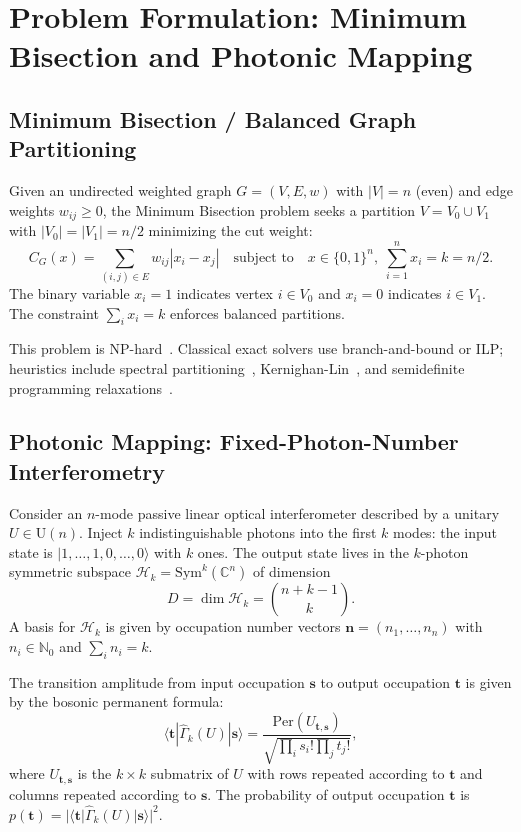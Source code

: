 \section{Problem Formulation: Minimum Bisection and Photonic Mapping}
\label{sec:problem}

\subsection{Minimum Bisection / Balanced Graph Partitioning}

Given an undirected weighted graph $G=(V,E,w)$ with $|V|=n$ (even) and edge weights $w_{ij}\ge 0$, the Minimum Bisection problem seeks a partition $V = V_0 \cup V_1$ with $|V_0|=|V_1|=n/2$ minimizing the cut weight:
\begin{equation}
\label{eq:min_bisection}
C_G(x) = \sum_{(i,j)\in E} w_{ij} |x_i - x_j| \quad \text{subject to} \quad x \in \{0,1\}^n,\; \sum_{i=1}^n x_i = k = n/2.
\end{equation}
The binary variable $x_i=1$ indicates vertex $i \in V_0$ and $x_i=0$ indicates $i \in V_1$. The constraint $\sum_i x_i = k$ enforces balanced partitions.

This problem is NP-hard~\cite{garey1976complexity}. Classical exact solvers use branch-and-bound or ILP; heuristics include spectral partitioning~\cite{fiedler1973algebraic}, Kernighan-Lin~\cite{kernighan1970efficient}, and semidefinite programming relaxations~\cite{goemans1995improved}.

\subsection{Photonic Mapping: Fixed-Photon-Number Interferometry}

Consider an $n$-mode passive linear optical interferometer described by a unitary $U \in \mathrm{U}(n)$. Inject $k$ indistinguishable photons into the first $k$ modes: the input state is $|1,\dots,1,0,\dots,0\rangle$ with $k$ ones. The output state lives in the $k$-photon symmetric subspace $\mathcal{H}_k = \mathrm{Sym}^k(\mathbb{C}^n)$ of dimension
\begin{equation}
D = \dim \mathcal{H}_k = \binom{n+k-1}{k}.
\end{equation}
A basis for $\mathcal{H}_k$ is given by occupation number vectors $\mathbf{n} = (n_1,\dots,n_n)$ with $n_i \in \mathbb{N}_0$ and $\sum_i n_i = k$.

The transition amplitude from input occupation $\mathbf{s}$ to output occupation $\mathbf{t}$ is given by the bosonic permanent formula:
\begin{equation}
\label{eq:bosonic_amplitude}
\langle \mathbf{t} | \hat{\Gamma}_k(U) | \mathbf{s} \rangle = \frac{\mathrm{Per}(U_{\mathbf{t},\mathbf{s}})}{\sqrt{\prod_i s_i! \prod_j t_j!}},
\end{equation}
where $U_{\mathbf{t},\mathbf{s}}$ is the $k\times k$ submatrix of $U$ with rows repeated according to $\mathbf{t}$ and columns repeated according to $\mathbf{s}$. The probability of output occupation $\mathbf{t}$ is $p(\mathbf{t}) = |\langle \mathbf{t} | \hat{\Gamma}_k(U) | \mathbf{s} \rangle|^2$.

